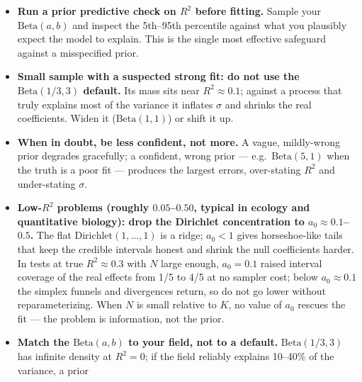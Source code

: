 \documentclass[
  letterpaper,
  DIV=11,
  numbers=noendperiod]{scrartcl}
\begin{document}
\begin{tcolorbox}[enhanced jigsaw, titlerule=0mm, arc=.35mm, leftrule=.75mm, colback=white, bottomtitle=1mm, toptitle=1mm, colbacktitle=quarto-callout-tip-color!10!white, colframe=quarto-callout-tip-color-frame, opacitybacktitle=0.6, bottomrule=.15mm, opacityback=0, toprule=.15mm, left=2mm, title=\textcolor{quarto-callout-tip-color}{\faLightbulb}\hspace{0.5em}{Tip}, rightrule=.15mm, breakable, coltitle=black]

\begin{itemize}
\item
  \textbf{Run a prior predictive check on \(R^2\) before fitting.}
  Sample your \(\text{Beta}(a, b)\) and inspect the 5th--95th percentile
  against what you plausibly expect the model to explain. This is the
  single most effective safeguard against a misspecified prior.
\item
  \textbf{Small sample with a suspected strong fit: do not use the
  \(\text{Beta}(1/3, 3)\) default.} Its mass sits near
  \(R^2 \approx 0.1\); against a process that truly explains most of the
  variance it inflates \(\sigma\) and shrinks the real coefficients.
  Widen it (\(\text{Beta}(1, 1)\)) or shift it up.
\item
  \textbf{When in doubt, be less confident, not more.} A vague,
  mildly-wrong prior degrades gracefully; a confident, wrong prior ---
  e.g.~\(\text{Beta}(5, 1)\) when the truth is a poor fit --- produces
  the largest errors, over-stating \(R^2\) and under-stating \(\sigma\).
\item
  \textbf{Low-\(R^2\) problems (roughly \(0.05\)--\(0.50\), typical in
  ecology and quantitative biology): drop the Dirichlet concentration to
  \(a_0 \approx 0.1\)--\(0.5\).} The flat
  \(\text{Dirichlet}(1,\dots,1)\) is a ridge; \(a_0 < 1\) gives
  horseshoe-like tails that keep the credible intervals honest and
  shrink the null coefficients harder. In tests at true
  \(R^2 \approx 0.3\) with \(N\) large enough, \(a_0 = 0.1\) raised
  interval coverage of the real effects from 1/5 to 4/5 at no sampler
  cost; below \(a_0 \approx 0.1\) the simplex funnels and divergences
  return, so do not go lower without reparameterizing. When \(N\) is
  small relative to \(K\), no value of \(a_0\) rescues the fit --- the
  problem is information, not the prior.
\item
  \textbf{Match the \(\text{Beta}(a, b)\) to your field, not to a
  default.} \(\text{Beta}(1/3, 3)\) has infinite density at \(R^2 = 0\);
  if the field reliably explains 10--40\% of the variance, a prior

\end{itemize}
\end{tcolorbox}
\end{document}
